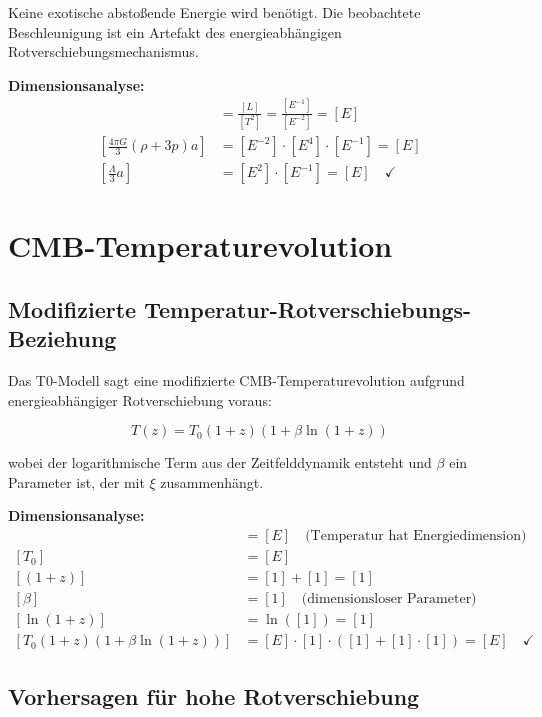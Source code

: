 \documentclass[12pt,a4paper]{report}
\begin{document}
	Keine exotische abstoßende Energie wird benötigt. Die beobachtete Beschleunigung ist ein Artefakt des energieabhängigen Rotverschiebungsmechanismus.
	
	\textbf{Dimensionsanalyse:}
	\begin{align}
		[\ddot{a}] &= \frac{[L]}{[T^2]} = \frac{[E^{-1}]}{[E^{-2}]} = [E] \\
		\left[\frac{4\pi G}{3}(\rho + 3p)a\right] &= [E^{-2}] \cdot [E^4] \cdot [E^{-1}] = [E] \\
		\left[\frac{\Lambda}{3}a\right] &= [E^2] \cdot [E^{-1}] = [E] \quad \checkmark
	\end{align}
	
	\section{CMB-Temperaturevolution}
	\label{sec:cmb_temperature_evolution}
	
	\subsection{Modifizierte Temperatur-Rotverschiebungs-Beziehung}
	\label{subsec:modified_temperature_redshift}
	
	Das T0-Modell sagt eine modifizierte CMB-Temperaturevolution aufgrund energieabhängiger Rotverschiebung voraus:
	
	\begin{equation}
		\boxed{T(z) = T_0(1+z)\left(1 + \beta \ln(1+z)\right)}
		\label{eq:cmb_temperature_evolution}
	\end{equation}
	
	wobei der logarithmische Term aus der Zeitfelddynamik entsteht und $\beta$ ein Parameter ist, der mit $\xi$ zusammenhängt.
	
	\textbf{Dimensionsanalyse:}
	\begin{align}
		[T(z)] &= [E] \quad \text{(Temperatur hat Energiedimension)} \\
		[T_0] &= [E] \\
		[(1+z)] &= [1] + [1] = [1] \\
		[\beta] &= [1] \quad \text{(dimensionsloser Parameter)} \\
		[\ln(1+z)] &= \ln([1]) = [1] \\
		[T_0(1+z)(1 + \beta \ln(1+z))] &= [E] \cdot [1] \cdot ([1] + [1] \cdot [1]) = [E] \quad \checkmark
	\end{align}
	
	\subsection{Vorhersagen für hohe Rotverschiebung}
	\label{subsec:high_redshift_predictions}
	
\end{document}
